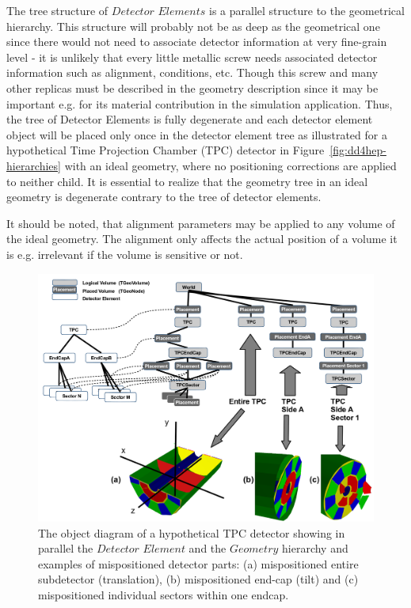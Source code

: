 \documentclass[10pt,a4paper]{article}
\begin{document}
\noindent
The tree structure of
$Detector$ $Elements$ is a parallel structure to the geometrical hierarchy.
This structure will probably not be as deep as the geometrical one since 
there would not need to associate detector information at very fine-grain 
level - it is unlikely that every little metallic screw
needs associated detector information such as alignment, conditions, etc.
Though this screw and many other replicas must be described in the geometry 
description since it may be important e.g. for its material contribution 
in the simulation application. Thus, the tree of Detector Elements is
fully degenerate and each detector element object will be placed only 
once in the detector element tree as illustrated for a hypothetical
Time Projection Chamber (TPC) detector in 
Figure~\ref{fig:dd4hep-hierarchies} with an ideal geometry,
where no positioning corrections are applied to neither child. It is essential to 
realize that the geometry tree in an ideal geometry is degenerate contrary 
to the tree of detector elements.

\noindent
It should be noted, that alignment parameters may be applied to any volume 
of the ideal geometry. The alignment only affects the actual position of 
a volume it is e.g. irrelevant if the volume is sensitive or not.

\begin{figure}[h]
  \begin{center}
    \includegraphics[width=160mm] {DDAlign_detelement_aligned_tree.png}
    \caption{The object diagram of a hypothetical TPC detector showing in
    parallel the $Detector$ $Element$ and the $Geometry$ hierarchy and examples
    of mispositioned detector parts: (a) mispositioned entire subdetector 
    (translation), (b) mispositioned end-cap (tilt) and (c) mispositioned
    individual sectors within one endcap.}
    \label{fig:dd4hep-aligned-hierarchies}
  \end{center}
\end{figure}
\end{document}
